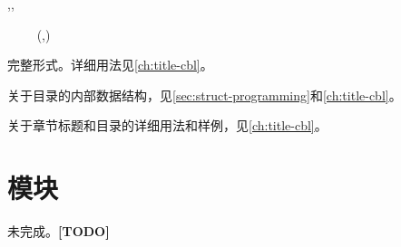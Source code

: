 \documentclass[twoside]{book}
\newcommand*{\TODO}{\textcolor{red!90!black}{\bfseries[TODO]}}
\begin{document}
\begin{function}{\SetSpecifiedCombinedListStyle,\SpecifiedCombinedList,
  \LocalSpecifiedCombinedList}
  \begin{syntax}
    \V\SetSpecifiedCombinedListStyle {} 
    ~~~~    
    \V\SpecifiedCombinedList {}
    \V\LocalSpecifiedCombinedList {}
    \V\LocalSpecifiedCombinedList {} \string(,\string)
  \end{syntax}
完整形式。详细用法见\cref{ch:title-cbl}。
\end{function}

关于目录的内部数据结构，见\cref{sec:struct-programming}和\cref{ch:title-cbl}。

关于章节标题和目录的详细用法和样例，见\cref{ch:title-cbl}。

\section{模块}
未完成。\TODO 





\end{document}
